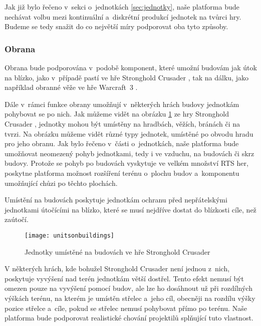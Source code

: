 Jak již bylo řečeno v~sekci o~jednotkách \ref{sec:jednotky}, naše platforma bude nechávat volbu mezi kontinuální a~diskrétní produkcí jednotek na tvůrci hry. Budeme se tedy snažit do co největší míry podporovat oba tyto způsoby. 

\subsubsection{Obrana}

Obrana bude podporována v~podobě komponent, které umožní budovám jak útok na blízko, jako v~případě pastí ve hře Stronghold Crusader \citep{site:strongholdcrus}, tak na dálku, jako například obranné věže ve hře Warcraft~3 \citep{site:warcraft3}. 

Dále v~rámci funkce obrany umožňují v~některých hrách budovy jednotkám pohybovat se po nich. Jak můžeme vidět na obrázku \ref{fig:unitsonbuildings} ze hry Stronghold Crusader \citep{site:strongholdcrus}, jednotky mohou být umístěny na hradbách, věžích, bránách či na tvrzi. Na obrázku můžeme vidět různé typy jednotek, umístěné po obvodu hradu pro jeho obranu. Jak bylo řečeno v~části o~jednotkách, naše platforma bude umožňovat neomezený pohyb jednotkami, tedy i ve vzduchu, na budovách či skrz budovy. Protože se pohyb po budovách vyskytuje ve velkém množství RTS her, poskytne platforma možnost rozšíření terénu o~plochu budov a~komponentu umožňující chůzi po těchto plochách.

Umístění na budovách poskytuje jednotkám ochranu před nepřátelskými jednotkami útočícími na blízko, které se musí nejdříve dostat do blízkosti cíle, než zaútočí. 

\begin{figure}[h]	
	\centering
	\texttt{[image: unitsonbuildings]}
	\caption{Jednotky umístěné na budovách ve hře Stronghold Crusader \citep{site:strongholdcrus}}
	\label{fig:unitsonbuildings}
\end{figure}

V některých hrách, kde bohužel Stronghold Crusader \citep{site:strongholdcrus} není jednou z~nich, poskytuje vyvýšení nad terén jednotkám větší dostřel. Tento efekt nemusí být omezen pouze na vyvýšení pomocí budov, ale lze ho dosáhnout už při rozdílných výškách terénu, na kterém je umístěn střelec a~jeho cíl, obecněji na rozdílu výšky pozice střelce a~cíle, pokud se střelec nemusí pohybovat přímo po terénu. Naše platforma bude podporovat realistické chování projektilů splňující tuto vlastnost. 

\done
{}
\done
{}

